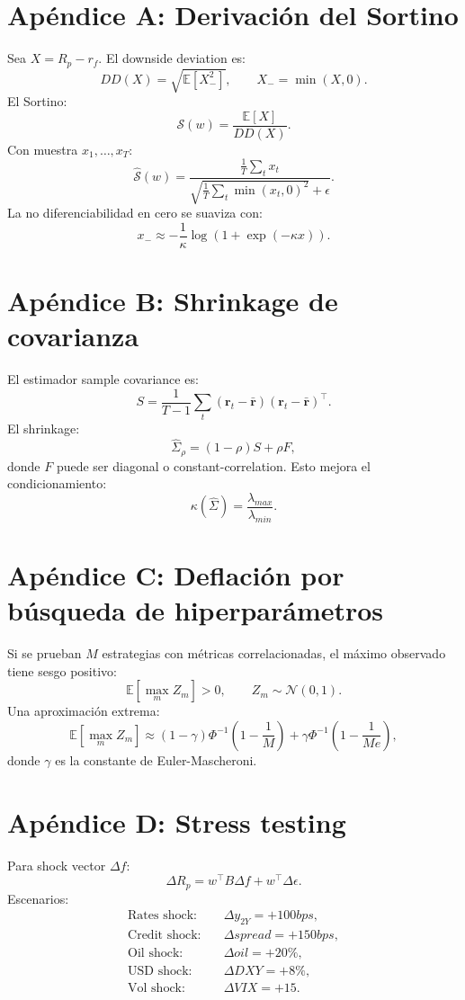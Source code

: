 \documentclass[11pt,letterpaper]{article}
\newcommand{\E}{\mathbb{E}}
\newcommand{\N}{\mathcal{N}}
\newcommand{\1}{\mathbf{1}}
\begin{document}
\newpage
\appendix

\section{Apéndice A: Derivación del Sortino}

Sea \(X=R_p-r_f\). El downside deviation es:
\[
    DD(X)=\sqrt{\E[X_-^2]},
    \qquad
    X_-=\min(X,0).
\]
El Sortino:
\[
    \mathcal{S}(w)=\frac{\E[X]}{DD(X)}.
\]
Con muestra \(x_1,\ldots,x_T\):
\[
    \widehat{\mathcal{S}}(w)
    =
    \frac{\frac{1}{T}\sum_t x_t}
    {\sqrt{\frac{1}{T}\sum_t \min(x_t,0)^2}+\epsilon}.
\]
La no diferenciabilidad en cero se suaviza con:
\[
    x_- \approx -\frac{1}{\kappa}\log(1+\exp(-\kappa x)).
\]

\section{Apéndice B: Shrinkage de covarianza}

El estimador sample covariance es:
\[
    S=\frac{1}{T-1}\sum_t(\bm r_t-\bar{\bm r})(\bm r_t-\bar{\bm r})^\top.
\]
El shrinkage:
\[
    \hat\Sigma_\rho=(1-\rho)S+\rho F,
\]
donde \(F\) puede ser diagonal o constant-correlation. Esto mejora el condicionamiento:
\[
    \kappa(\hat\Sigma)=\frac{\lambda_{max}}{\lambda_{min}}.
\]

\section{Apéndice C: Deflación por búsqueda de hiperparámetros}

Si se prueban \(M\) estrategias con métricas correlacionadas, el máximo observado tiene sesgo positivo:
\[
    \E[\max_m Z_m]>0,
    \qquad Z_m\sim\N(0,1).
\]
Una aproximación extrema:
\[
    \E[\max_m Z_m]
    \approx
    (1-\gamma)\Phi^{-1}\left(1-\frac{1}{M}\right)
    +
    \gamma\Phi^{-1}\left(1-\frac{1}{Me}\right),
\]
donde \(\gamma\) es la constante de Euler-Mascheroni.

\section{Apéndice D: Stress testing}

Para shock vector \(\Delta f\):
\[
    \Delta R_p
    =
    w^\top B\Delta f
    +
    w^\top \Delta\epsilon.
\]
Escenarios:
\[
\begin{aligned}
    \text{Rates shock:} &\quad \Delta y_{2Y}=+100bps,\\
    \text{Credit shock:} &\quad \Delta spread=+150bps,\\
    \text{Oil shock:} &\quad \Delta oil=+20\%,\\
    \text{USD shock:} &\quad \Delta DXY=+8\%,\\
    \text{Vol shock:} &\quad \Delta VIX=+15.
\end{aligned}
\]
\end{document}
